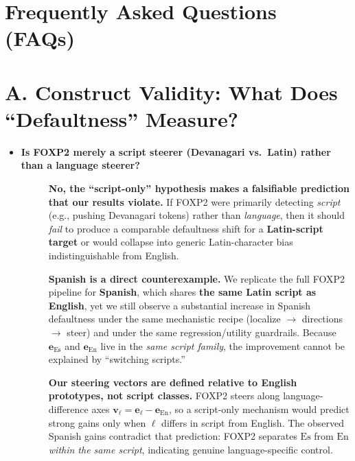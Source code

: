 \section{Frequently Asked Questions (FAQs)}
\label{sec:FAQs}


\section*{A. Construct Validity: What Does “Defaultness” Measure?}

\begin{itemize}[leftmargin=1.5em]

\item[\ding{93}] \textbf{Is FOXP2 merely a script steerer (Devanagari vs.\ Latin) rather than a language steerer?}

\begin{description}
\item[]
\textbf{No, the “script-only” hypothesis makes a falsifiable prediction that our results violate.}
If FOXP2 were primarily detecting \emph{script} (e.g., pushing Devanagari tokens) rather than \emph{language}, then it should \emph{fail} to produce a comparable defaultness shift for a \textbf{Latin-script target} or would collapse into generic Latin-character bias indistinguishable from English.

\item[]
\textbf{Spanish is a direct counterexample.}
We replicate the full FOXP2 pipeline for \textbf{Spanish}, which shares \textbf{the same Latin script as English}, yet we still observe a substantial increase in Spanish defaultness under the same mechanistic recipe (localize $\to$ directions $\to$ steer) and under the same regression/utility guardrails.
Because \(\mathbf{e}_{\mathrm{Es}}\) and \(\mathbf{e}_{\mathrm{En}}\) live in the \emph{same script family}, the improvement cannot be explained by “switching scripts.”

\item[]
\textbf{Our steering vectors are defined relative to English prototypes, not script classes.}
FOXP2 steers along language-difference axes
\(\mathbf{v}_{\ell}=\mathbf{e}_{\ell}-\mathbf{e}_{\mathrm{En}}\),
so a script-only mechanism would predict strong gains only when \(\ell\) differs in script from English.
The observed Spanish gains contradict that prediction: FOXP2 separates \(\mathrm{Es}\) from \(\mathrm{En}\) \emph{within the same script}, indicating genuine language-specific control.


\end{description}
\end{itemize}
